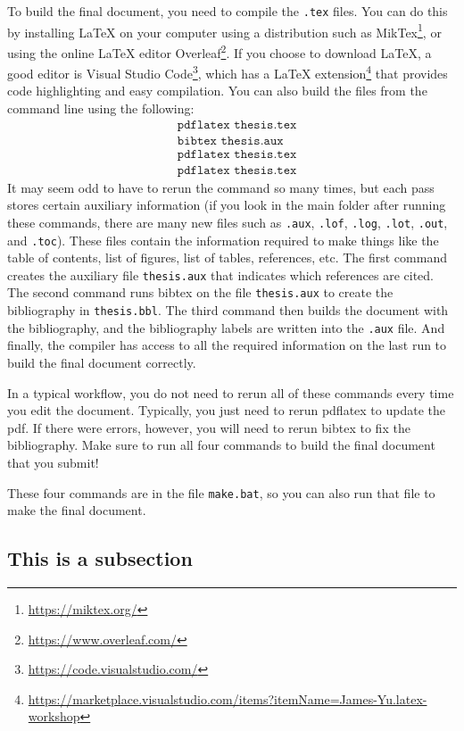 To build the final document, you need to compile the \texttt{.tex} files. You can do this by installing LaTeX on your computer using a distribution such as MikTex\footnote{\url{https://miktex.org/}}, or using the online LaTeX editor Overleaf\footnote{\url{https://www.overleaf.com/}}. If you choose to download LaTeX, a good editor is Visual Studio Code\footnote{\url{https://code.visualstudio.com/}}, which has a LaTeX extension\footnote{\url{https://marketplace.visualstudio.com/items?itemName=James-Yu.latex-workshop}} that provides code highlighting and easy compilation. You can also build the files from the command line using the following:
{\setlength{\jot}{-3pt}
  \begin{align*}
    &\texttt{pdflatex thesis.tex}\\
    &\texttt{bibtex thesis.aux}\\
    &\texttt{pdflatex thesis.tex}\\
    &\texttt{pdflatex thesis.tex}
  \end{align*}}
It may seem odd to have to rerun the command so many times, but each pass stores certain auxiliary information (if you look in the main folder after running these commands, there are many new files such as \texttt{.aux}, \texttt{.lof}, \texttt{.log}, \texttt{.lot}, \texttt{.out}, and \texttt{.toc}). These files contain the information required to make things like the table of contents, list of figures, list of tables, references, etc. The first command creates the auxiliary file \texttt{thesis.aux} that indicates which references are cited. The second command runs bibtex on the file \texttt{thesis.aux} to create the bibliography in \texttt{thesis.bbl}. The third command then builds the document with the bibliography, and the bibliography labels are written into the \texttt{.aux} file. And finally, the compiler has access to all the required information on the last run to build the final document correctly.

In a typical workflow, you do not need to rerun all of these commands every time you edit the document. Typically, you just need to rerun pdflatex to update the pdf. If there were errors, however, you will need to rerun bibtex to fix the bibliography. Make sure to run all four commands to build the final document that you submit!

These four commands are in the file \texttt{make.bat}, so you can also run that file to make the final document.

\subsection{This is a subsection}

